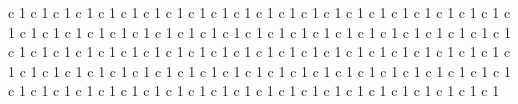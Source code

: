 \documentclass[11pt]{article}
\begin{document}
  c 1    c 1    c 1    c 1    c 1    c 1    c 1    c 1    c 1    c 1    c 1    c 1    c 1    c 1    c 1    c 1    c 1    c 1    c 1    c 1    c 1    c 1    c 1    c 1    c 1    c 1    c 1    c 1    c 1    c 1    c 1    c 1    c 1    c 1    c 1    c 1    c 1    c 1    c 1    c 1    c 1    c 1    c 1    c 1    c 1    c 1    c 1    c 1 
  c 1    c 1    c 1    c 1    c 1    c 1    c 1    c 1    c 1    c 1    c 1    c 1    c 1    c 1    c 1    c 1    c 1    c 1    c 1    c 1    c 1    c 1    c 1    c 1    c 1    c 1    c 1    c 1    c 1    c 1    c 1    c 1    c 1    c 1    c 1    c 1    c 1    c 1    c 1    c 1    c 1    c 1 
  c 1    c 1    c 1    c 1    c 1    c 1    c 1    c 1    c 1    c 1    c 1    c 1    c 1    c 1    c 1    c 1    c 1    c 1    c 1    c 1    c 1    c 1 
\end{document}
